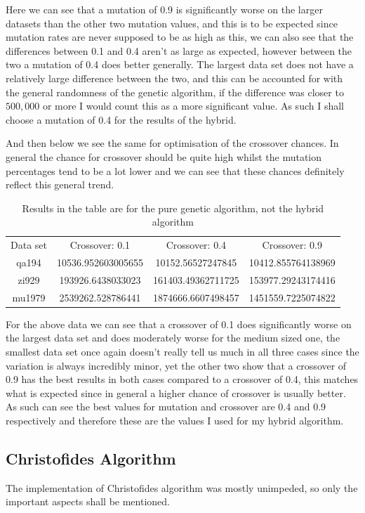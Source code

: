 \documentclass[11pt,a4paper,titlepage]{article}
\begin{document}
Here we can see that a mutation of 0.9 is significantly worse on the larger datasets than the other two mutation values, and this is to be expected since mutation rates are never supposed to be as high as this, we can also see that the differences between 0.1 and 0.4 aren't as large as expected, however between the two a mutation of 0.4 does better generally. The largest data set does not have a relatively large difference between the two, and this can be accounted for with the general randomness of the genetic algorithm, if the difference was closer to $500,000$ or more I would count this as a more significant value. As such I shall choose a mutation of 0.4 for the results of the hybrid.

And then below we see the same for optimisation of the crossover chances. In general the chance for crossover should be quite high whilst the mutation percentages tend to be a lot lower and we can see that these chances definitely reflect this general trend.

\begin{table}[h]
\centering
\begin{tabular}{c | c | c | c}
Data set & Crossover: 0.1 & Crossover: 0.4 & Crossover: 0.9 \\ [0.5ex]
\Xhline{1.5pt}
	qa194 & 10536.952603005655 & 10152.56527247845 & 10412.855764138969 \\
\hline
	zi929 & 193926.6438033023 & 161403.49362711725 & 153977.29243174416 \\
\hline
	mu1979 & 2539262.528786441 & 1874666.6607498457 & 1451559.7225074822

\end{tabular}
\caption{Results in the table are for the pure genetic algorithm, not the hybrid algorithm}
\end{table}

For the above data we can see that a crossover of 0.1 does significantly worse on the largest data set and does moderately worse for the medium sized one, the smallest data set once again doesn't really tell us much in all three cases since the variation is always incredibly minor, yet the other two show that a crossover of 0.9 has the best results in both cases compared to a crossover of 0.4, this matches what is expected since in general a higher chance of crossover is usually better. As such can see the best values for mutation and crossover are 0.4 and 0.9 respectively and therefore these are the values I used for my hybrid algorithm.

\subsection{Christofides Algorithm}
The implementation of Christofides algorithm was mostly unimpeded, so only the important aspects shall be mentioned.
\end{document}
